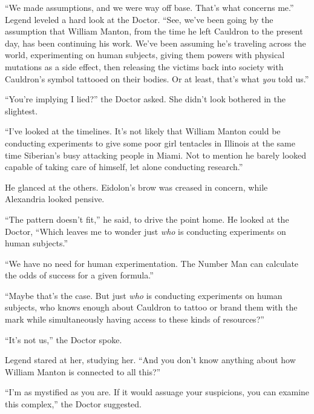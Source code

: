 ``We made assumptions, and we were way off base.  That's what concerns me.''  Legend leveled a hard look at the Doctor.  ``See, we've been going by the assumption that William Manton, from the time he left Cauldron to the present day, has been continuing his work.  We've been assuming he's traveling across the world, experimenting on human subjects, giving them powers with physical mutations as a side effect, then releasing the victims back into society with Cauldron's symbol tattooed on their bodies.  Or at least, that's what \emph{you} told us.''



``You're implying I lied?'' the Doctor asked.  She didn't look bothered in the slightest.



``I've looked at the timelines.  It's not likely that William Manton could be conducting experiments to give some poor girl tentacles in Illinois at the same time Siberian's busy attacking people in Miami.  Not to mention he barely looked capable of taking care of himself, let alone conducting research.''



He glanced at the others.  Eidolon's brow was creased in concern, while Alexandria looked pensive.



``The pattern doesn't fit,'' he said, to drive the point home.  He looked at the Doctor, ``Which leaves me to wonder just \emph{who} is conducting experiments on human subjects.''



``We have no need for human experimentation.  The Number Man can calculate the odds of success for a given formula.''



``Maybe that's the case.  But just \emph{who} is conducting experiments on human subjects, who knows enough about Cauldron to tattoo or brand them with the mark while simultaneously having access to these kinds of resources?''



``It's not us,'' the Doctor spoke.



Legend stared at her, studying her.  ``And you don't know anything about how William Manton is connected to all this?''



``I'm as mystified as you are.  If it would assuage your suspicions, you can examine this complex,'' the Doctor suggested.



